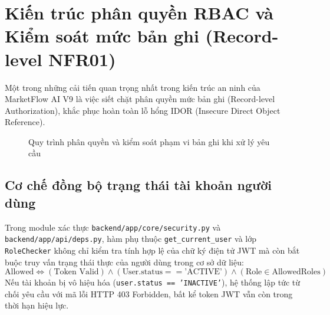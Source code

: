 \section{Kiến trúc phân quyền RBAC và Kiểm soát mức bản ghi (Record-level NFR01)}

Một trong những cải tiến quan trọng nhất trong kiến trúc an ninh của MarketFlow AI V9 là việc siết chặt phân quyền mức bản ghi (Record-level Authorization), khắc phục hoàn toàn lỗ hổng IDOR (Insecure Direct Object Reference).

\begin{figure}[H]
\centering

\caption{Quy trình phân quyền và kiểm soát phạm vi bản ghi khi xử lý yêu cầu}
\label{fig:v9-auth-sequence}
\end{figure}

\subsection{Cơ chế đồng bộ trạng thái tài khoản người dùng}
Trong module xác thực \texttt{backend/app/core/security.py} và \texttt{backend/app/api/deps.py}, hàm phụ thuộc \texttt{get\_current\_user} và lớp \texttt{RoleChecker} không chỉ kiểm tra tính hợp lệ của chữ ký điện tử JWT mà còn bắt buộc truy vấn trạng thái thực của người dùng trong cơ sở dữ liệu:
\begin{equation}
\text{Allowed} \iff (\text{Token Valid}) \land (\text{User.status} == \text{'ACTIVE'}) \land (\text{Role} \in \text{AllowedRoles})
\end{equation}
Nếu tài khoản bị vô hiệu hóa (\texttt{user.status == 'INACTIVE'}), hệ thống lập tức từ chối yêu cầu với mã lỗi HTTP 403 Forbidden, bất kể token JWT vẫn còn trong thời hạn hiệu lực.

